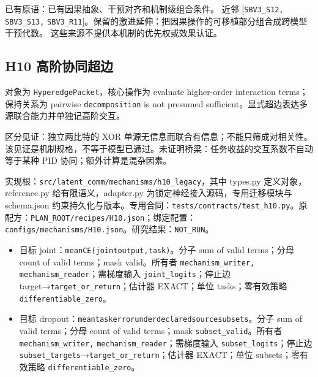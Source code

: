 \documentclass[
  10pt,
]{article}
\begin{document}
已有原语：已有因果抽象、干预对齐和机制级组合条件。 近邻
{[}\nolinkurl{SBV3_S12,} \nolinkurl{SBV3_S13,}
\nolinkurl{SBV3_R11}{]}。保留的激进延伸：把因果操作的可移植部分组合成跨模型干预代数。
这些来源不提供本机制的优先权或效果认证。

\subsection{H10
高阶协同超边}\label{h10-ux9ad8ux9636ux534fux540cux8d85ux8fb9}

对象为 \nolinkurl{HyperedgePacket}，核心操作为 evaluate higher-order
interaction terms；保持关系为 pairwise \nolinkurl{decomposition} is not
presumed sufficient。显式超边表达多源联合能力并单独记高阶交互。

区分见证：独立两比特的 XOR 单源无信息而联合有信息；不能只筛成对相关性。
该见证是机制规格，不等于模型已通过。未证明桥梁：任务收益的交互系数不自动等于某种
PID 协同；额外计算是混杂因素。

实现根：{\small\nolinkurl{src/latent_comm/mechanisms/h10_legacy}}，其中
types.py 定义对象，reference.py 给有限语义，adapter.py
为锁定神经接入源码，专用迁移模块与 schema.json
约束持久化与版本。专用合同：{\small\nolinkurl{tests/contracts/test_h10.py}}。原配方：{\small\nolinkurl{PLAN_ROOT/recipes/H10.json}}；绑定配置：{\small\nolinkurl{configs/mechanisms/H10.json}}。研究结果：\nolinkurl{NOT_RUN}。

\begin{itemize}
\item
  目标
  joint：{\small\nolinkurl{mean}\hspace{0.333em}\nolinkurl{CE(joint}\hspace{0.333em}\nolinkurl{output,task)}}。分子
  sum of valid terms；分母 count of valid terms；mask valid。所有者
  \nolinkurl{mechanism_writer,} \nolinkurl{mechanism_reader}；需梯度输入
  \nolinkurl{joint_logits}；停止边
  target→\nolinkurl{target_or_return}；估计器 EXACT；单位
  tasks；零有效策略 \nolinkurl{differentiable_zero}。
\item
  目标
  dropout：{\small\nolinkurl{mean}\hspace{0.333em}\nolinkurl{task}\hspace{0.333em}\nolinkurl{error}\hspace{0.333em}\nolinkurl{under}\hspace{0.333em}\nolinkurl{declared}\hspace{0.333em}\nolinkurl{source}\hspace{0.333em}\nolinkurl{subsets}}。分子
  sum of valid terms；分母 count of valid terms；mask
  \nolinkurl{subset_valid}。所有者 \nolinkurl{mechanism_writer,}
  \nolinkurl{mechanism_reader}；需梯度输入
  \nolinkurl{subset_logits}；停止边
  \nolinkurl{subset_targets}→\nolinkurl{target_or_return}；估计器
  EXACT；单位 subsets；零有效策略 \nolinkurl{differentiable_zero}。
\end{itemize}
\end{document}
